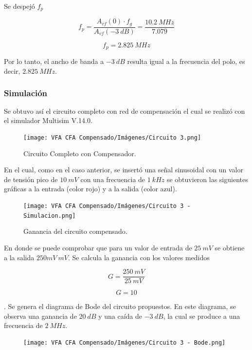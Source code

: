 \newpage
\hspace{1mm} Se despejó \(f_p\)

\begin{equation}
    f_p = \frac{A_{vf} (0) \cdot f_g}{A_{vf}(-3~dB)} = \frac{10.2~MHz}{7.079}
\end{equation}

\begin{equation}
    \boxed{
    f_p = 2.825~MHz
    }
\end{equation}

\hspace{1mm} Por lo tanto, el ancho de banda a \(-3~dB\) resulta igual a la frecuencia del polo, es decir, \(2.825~MHz\).

\subsubsection{Simulación}

\hspace{1mm} Se obtuvo así el circuito completo con red de compensación el cual se realizó con el simulador Multisim V.14.0.

\begin{figure}[!h]
    \centering
    \texttt{[image: VFA CFA Compensado/Imágenes/Circuito 3.png]}
    \caption{Circuito Completo con Compensador.}
\end{figure}

\hspace{1mm} En el cual, como en el caso anterior, se insertó una señal sinusoidal con un valor de tensión pico de \(10~mV\) con una frecuencia de \( 1~kHz \) se obtuvieron las siguientes gráficas a la entrada (color rojo) y a la salida (color azul).

\begin{figure}[!h]
    \centering
    \texttt{[image: VFA CFA Compensado/Imágenes/Circuito 3 - Simulacion.png]}
    \caption{Ganancia del circuito compensado.}
\end{figure}

\hspace{1mm} En donde se puede comprobar que para un valor de entrada de \( 25~mV \) se obtiene a la salida \( 250mV~mV \). Se calcula la ganancia con los valores medidos

\begin{equation}
    G = \frac{250~mV}{25~mV}
\end{equation}

\begin{equation}
    \boxed{
    G = 10
    }
\end{equation}

\newpage
.\hspace{1mm} Se genera el diagrama de Bode del circuito propuestos. En este diagrama, se observa una ganancia de \(20~dB\) y una caída de \(-3~dB\), la cual se produce a una frecuencia de \(2~MHz\).

\begin{figure}[!h]
    \centering
    \texttt{[image: VFA CFA Compensado/Imágenes/Circuito 3 - Bode.png]}
\end{figure}
